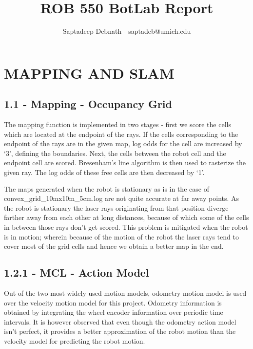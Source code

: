 \documentclass[journal,twocolumn]{IEEEtran}
\begin{document}
\title{%
  ROB 550 BotLab Report \\
  }
    
\author{Saptadeep Debnath - saptadeb@umich.edu}

\maketitle

\IEEEpeerreviewmaketitle

\section{MAPPING AND SLAM}

\subsection*{1.1 - Mapping - Occupancy Grid} 

The mapping function is implemented in two stages - first we score the cells which are located at the endpoint of the rays. If the cells corresponding to the endpoint of the rays are in the given map, log odds for the cell are increased by `3', defining the boundaries. Next, the cells between the robot cell and the endpoint cell are scored. Bresenham's line algorithm is then used to rasterize the given ray. The log odds of these free cells are then decreased by `1'. 

The maps generated when the robot is stationary as is in the case of convex\_grid\_10mx10m\_5cm.log are not quite accurate at far away points. As the robot is stationary the laser rays originating from that position diverge farther away from each other at long distances, because of which some of the cells in between those rays don't get scored. This problem is mitigated when the robot is in motion; wherein because of the motion of the robot the laser rays tend to cover most of the grid cells and hence we obtain a better map in the end.  

\subsection*{1.2.1 - MCL - Action Model} 

Out of the two most widely used motion models, odometry motion model is used over the velocity motion model for this project. Odometry information is obtained by integrating the wheel encoder information over periodic time intervals. It is however observed that even though the odometry action model isn't perfect, it provides a better approximation of the robot motion than the velocity model for predicting the robot motion.
\end{document}
